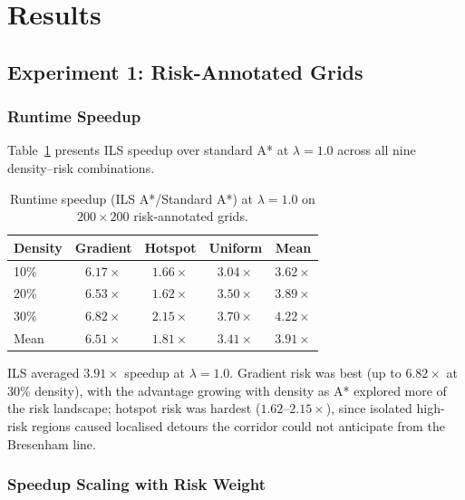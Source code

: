 \documentclass[preprint,12pt,authoryear]{elsarticle}
\begin{document}
\section{Results}\label{sec:results}

\subsection{Experiment 1: Risk-Annotated Grids}

\subsubsection{Runtime Speedup}

Table~\ref{tab:exp1_speedup} presents ILS speedup over standard A* at $\lambda = 1.0$ across all nine density--risk combinations.

\begin{table}[!htbp]
\centering
\caption{Runtime speedup (ILS A*/Standard A*) at $\lambda = 1.0$ on $200 \times 200$ risk-annotated grids.}
\label{tab:exp1_speedup}
\begin{tabular}{lcccc}
\toprule
\textbf{Density} & \textbf{Gradient} & \textbf{Hotspot} & \textbf{Uniform} & \textbf{Mean} \\
\midrule
10\% & $6.17\times$ & $1.66\times$ & $3.04\times$ & $3.62\times$ \\
20\% & $6.53\times$ & $1.62\times$ & $3.50\times$ & $3.89\times$ \\
30\% & $6.82\times$ & $2.15\times$ & $3.70\times$ & $4.22\times$ \\
\midrule
Mean & $6.51\times$ & $1.81\times$ & $3.41\times$ & $3.91\times$ \\
\bottomrule
\end{tabular}
\end{table}

ILS averaged $3.91\times$ speedup at $\lambda = 1.0$. Gradient risk was best (up to $6.82\times$ at 30\% density), with the advantage growing with density as A* explored more of the risk landscape; hotspot risk was hardest ($1.62$--$2.15\times$), since isolated high-risk regions caused localised detours the corridor could not anticipate from the Bresenham line.

\subsubsection{Speedup Scaling with Risk Weight}
\end{document}

